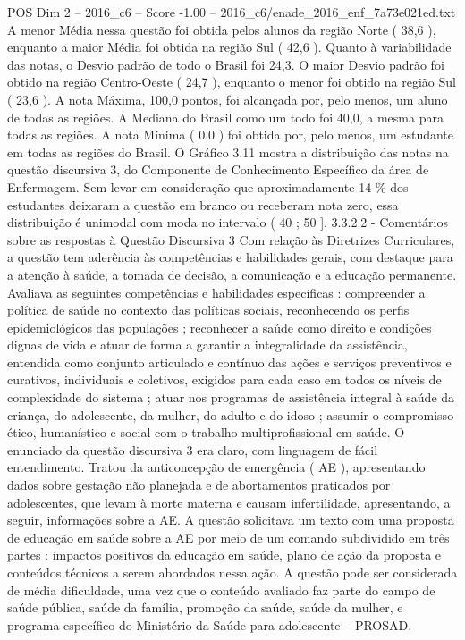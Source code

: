 \begin{textsample}{POS Dim 2 – 2016\_c6 – Score -1.00 – 2016\_c6/enade\_2016\_enf\_7a73e021ed.txt}
A menor Média nessa questão foi obtida pelos alunos da região Norte ( 38,6 ), enquanto a maior Média foi obtida na região Sul ( 42,6 ).
Quanto à variabilidade das notas, o Desvio padrão de todo o Brasil foi 24,3.
O maior Desvio padrão foi obtido na região Centro-Oeste ( 24,7 ), enquanto o menor foi obtido na região Sul ( 23,6 ).
A nota Máxima, 100,0 pontos, foi alcançada por, pelo menos, um aluno de todas as regiões.
A Mediana do Brasil como um todo foi 40,0, a mesma para todas as regiões.
A nota Mínima ( 0,0 ) foi obtida por, pelo menos, um estudante em todas as regiões do Brasil.
O Gráfico 3.11 mostra a distribuição das notas na questão discursiva 3, do Componente de Conhecimento Específico da área de Enfermagem.
Sem levar em consideração que aproximadamente 14 \% dos estudantes deixaram a questão em branco ou receberam nota zero, essa distribuição é unimodal com moda no intervalo ( 40 ; 50 ]. 3.3.2.2 - Comentários sobre as respostas à Questão Discursiva 3 Com relação às Diretrizes Curriculares, a questão tem aderência às competências e habilidades gerais, com destaque para a atenção à saúde, a tomada de decisão, a comunicação e a educação permanente.
Avaliava as seguintes competências e habilidades específicas : compreender a política de saúde no contexto das políticas sociais, reconhecendo os perfis epidemiológicos das populações ; reconhecer a saúde como direito e condições dignas de vida e atuar de forma a garantir a integralidade da assistência, entendida como conjunto articulado e contínuo das ações e serviços preventivos e curativos, individuais e coletivos, exigidos para cada caso em todos os níveis de complexidade do sistema ; atuar nos programas de assistência integral à saúde da criança, do adolescente, da mulher, do adulto e do idoso ; assumir o compromisso ético, humanístico e social com o trabalho multiprofissional em saúde.
O enunciado da questão discursiva 3 era claro, com linguagem de fácil entendimento.
Tratou da anticoncepção de emergência ( AE ), apresentando dados sobre gestação não planejada e de abortamentos praticados por adolescentes, que levam à morte materna e causam infertilidade, apresentando, a seguir, informações sobre a AE.
A questão solicitava um texto com uma proposta de educação em saúde sobre a AE por meio de um comando subdividido em três partes : impactos positivos da educação em saúde, plano de ação da proposta e conteúdos técnicos a serem abordados nessa ação.
A questão pode ser considerada de média dificuldade, uma vez que o conteúdo avaliado faz parte do campo de saúde pública, saúde da família, promoção da saúde, saúde da mulher, e programa específico do Ministério da Saúde para adolescente – PROSAD.

\end{textsample}
